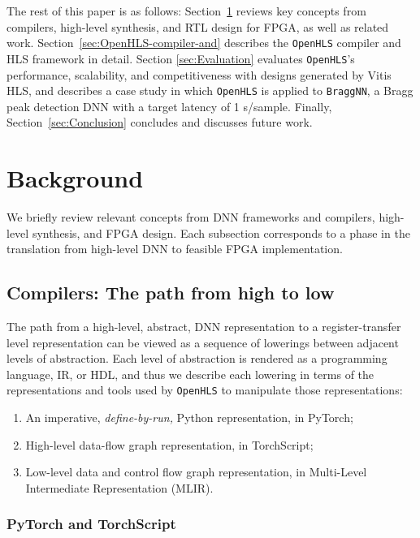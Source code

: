 \documentclass[10pt]{sig-alternate}
\begin{document}
The rest of this paper is as follows: Section~\ref{sec:Background}
reviews key concepts from compilers, high-level synthesis, and RTL
design for FPGA, as well as related work. Section~\ref{sec:OpenHLS-compiler-and} describes
the \texttt{OpenHLS} compiler and HLS framework in detail. Section
\ref{sec:Evaluation} evaluates \texttt{OpenHLS}\textquoteright s
performance, scalability, and competitiveness with designs generated
by Vitis HLS, and  %
describes a
case study in which \texttt{OpenHLS} is applied to \texttt{BraggNN}, a
Bragg peak detection DNN with a target latency of 1 \textmu s/sample.
Finally, Section~\ref{sec:Conclusion} concludes and discusses future work.

\section{Background}\label{sec:Background}

We briefly review relevant concepts from DNN frameworks and compilers, high-level synthesis, and FPGA design. Each subsection corresponds to a phase in the translation from high-level DNN to feasible FPGA implementation.

\subsection{Compilers: The path from high to low}

The path from a high-level, abstract, DNN representation to a
register-transfer level representation can be viewed as a sequence
of %
lowerings between adjacent levels of abstraction. Each
level of abstraction is rendered as a programming language, IR, or
HDL, and thus we describe each lowering in terms of the representations
and tools used by \texttt{OpenHLS} to manipulate those representations:
\begin{enumerate}
\item An imperative, \emph{define-by-run,} Python representation, in PyTorch;
\item High-level data-flow graph representation, in TorchScript;
\item Low-level data and control flow graph representation, in Multi-Level Intermediate Representation (MLIR).
\end{enumerate}
%

\subsubsection{PyTorch and TorchScript}
\end{document}

